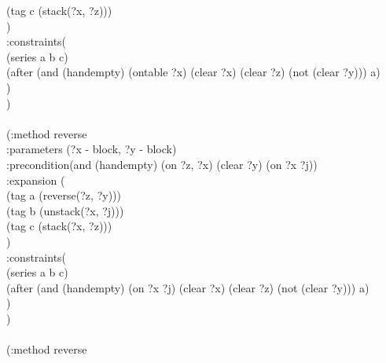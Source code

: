 \begin{appendix}
\hspace*{2.5cm}        (tag c (stack(?x, ?z)))\\
\hspace*{2cm}  )\\
\hspace*{2cm}  :constraints(\\
\hspace*{2.5cm}        (series a b c)\\
\hspace*{2.5cm}        (after (and (handempty) (ontable ?x) (clear ?x) (clear ?z) (not (clear ?y))) a)\\
\hspace*{2cm}  )\\
\hspace*{1.5cm})
\\
\\ \hspace*{1.5cm}(:method reverse\\
\hspace*{2cm}  :parameters  (?x - block, ?y - block)\\
\hspace*{2cm}  :precondition(and (handempty) (on ?z, ?x) (clear ?y) (on ?x ?j))\\
\hspace*{2cm}  :expansion  (\\
\hspace*{2.5cm}        (tag a (reverse(?z, ?y)))\\
\hspace*{2.5cm}        (tag b (unstack(?x, ?j)))\\
\hspace*{2.5cm}        (tag c (stack(?x, ?z)))\\
\hspace*{2cm}  )\\
\hspace*{2cm}  :constraints(\\
\hspace*{2.5cm}        (series a b c)\\
\hspace*{2.5cm}        (after (and (handempty) (on ?x ?j) (clear ?x) (clear ?z) (not (clear ?y))) a)\\
\hspace*{2cm}  )\\
\hspace*{1.5cm})
\\
\\ \hspace*{1.5cm}(:method reverse\\

\end{appendix}
